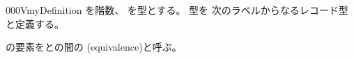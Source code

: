 \documentclass[index]{subfiles}
\begin{document}
\begin{myBlock}{000V}{myDefinition}
  を階数、
  を型とする。
  型を
  次のラベルからなるレコード型と定義する。
  \begin{myDisplayMath}
  \end{myDisplayMath}
  の要素をとの間の
  (equivalence)と呼ぶ。
\end{myBlock}
\end{document}
